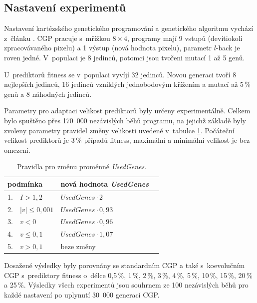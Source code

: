 \documentclass[fleqn,11pt]{ExcelAtFIT} %
\begin{document}
\subsection{Nastavení experimentů}

Nastavení kartézského genetického programování a genetického algoritmu vychází z~článku \cite{SikuPPSN}. CGP pracuje s~mřížkou $8 \times 4$, programy mají 9 vstupů (devítiokolí zpracovávaného pixelu) a 1 výstup (nová hodnota pixelu), parametr $l$-back je roven jedné. V~populaci je 8 jedinců, potomci jsou tvořeni mutací 1 až 5 genů.

U~prediktorů fitness se v~populaci vyvíjí 32 jedinců. Novou generaci tvoří 8 nejlepších jedinců, 16 jedinců vzniklých jednobodovým křížením a mutací až 5\,\% genů a 8 náhodných jedinců.

Parametry pro adaptaci velikost prediktorů byly určeny experimentálně. Celkem bylo spuštěno přes 170~000 nezávislých běhů programu, na jejichž základě byly zvoleny parametry pravidel změny velikosti uvedené v~tabulce \ref{table:rules}. Počáteční velikost prediktorů je 3\,\% případů fitness, maximální a minimální velikost je bez omezení.

\begin{table}[hbt]
    \vskip6pt
    \caption{Pravidla pro změnu proměnné \textit{UsedGenes}.}
    \label{table:rules}
    \centering
    \renewcommand{\arraystretch}{1.1}
    \begin{tabular}{llll}
        \toprule
        \multicolumn{2}{l}{podmínka}      &  nová hodnota \textit{UsedGenes}  \\
        \midrule
        1. &  $I > 1,2$                   &  $\mathit{UsedGenes} \cdot 2    $     \\
        2. &  $\left|v\right| \leq 0,001$ &  $\mathit{UsedGenes} \cdot 0,93 $  \\
        3. &  $v < 0$                     &  $\mathit{UsedGenes} \cdot 0,96 $  \\
        4. &  $v \leq 0,1$                &  $\mathit{UsedGenes} \cdot 1,07 $  \\
        5. &  $v > 0,1$                   &  beze změny             \\
        \bottomrule
    \end{tabular}
\end{table}

Dosažené výsledky byly porovnány se standardním CGP a také s~koevolučním CGP s~prediktory fitness o~délce 0,5\,\%, 1\,\%, 2\,\%, 3\,\%, 4\,\%, 5\,\%, 10\,\%, 15\,\%, 20\,\% a 25\,\%. Výsledky všech experimentů jsou souhrnem ze 100 nezávislých běhů pro každé nastavení po uplynutí 30~000 generací CGP.
\end{document}

